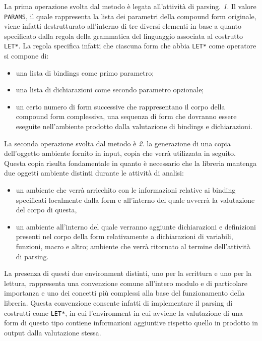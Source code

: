 La prima operazione svolta dal metodo è legata all'attività di parsing.
\textit{1.} Il valore \texttt{PARAMS}, il quale rappresenta la lista dei
parametri della compound form originale, viene infatti destrutturato all’interno
di tre diversi elementi in base a quanto specificato dalla regola della
grammatica del linguaggio associata al costrutto \texttt{LET*}. La regola
specifica infatti che ciascuna form che abbia \texttt{LET*} come operatore
si compone di:

\begin{itemize}

\item una lista di bindings come primo parametro;

\item una lista di dichiarazioni come secondo parametro opzionale;

\item un certo numero di form successive che rappresentano il corpo della
compound form complessiva, una sequenza di form che dovranno essere eseguite
nell’ambiente prodotto dalla valutazione di bindings e dichiarazioni.

\end{itemize}

La seconda operazione svolta dal metodo è \textit{2.} la generazione di una
copia dell’oggetto ambiente fornito in input, copia che verrà utilizzata in
seguito. Questa copia risulta fondamentale in quanto è necessario che la
libreria mantenga due oggetti ambiente distinti durante le attività di analisi:

\begin{itemize}

\item un ambiente che verrà arricchito con le informazioni relative ai binding
specificati localmente dalla form e all'interno del quale avverrà la valutazione
del corpo di questa,

\item un ambiente all'interno del quale verranno aggiunte dichiarazioni e
definizioni presenti nel corpo della form relativamente a dichiarazioni di
variabili, funzioni, macro e altro; ambiente che verrà ritornato al termine
dell'attività di parsing.

\end{itemize}

La presenza di questi due environment distinti, uno per la scrittura e uno per
la lettura, rappresenta una convenzione comune all’intero modulo e di
particolare importanza e uno dei concetti più complessi alla base del
funzionamento della libreria. Questa convenzione consente infatti di
implementare il parsing di costrutti come \texttt{LET*}, in cui l’environment in
cui avviene la valutazione di una form di questo tipo contiene informazioni
aggiuntive rispetto quello in prodotto in output dalla valutazione stessa.\\

